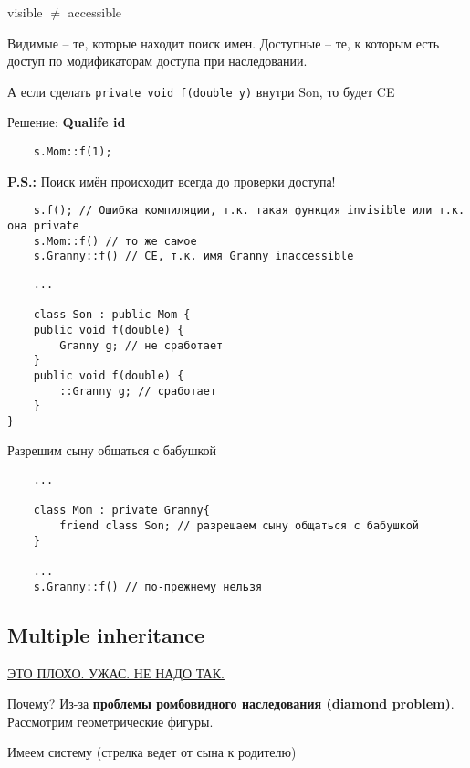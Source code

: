 \documentclass[12pt]{article}
\newcommand{\ps}{\textbf{P.S.: }}
\begin{document}
\begin{center}
visible $\not=$ accessible
\end{center}

Видимые -- те, которые находит поиск имен. 
Доступные -- те, к которым есть доступ по модификаторам доступа при наследовании. 

А если сделать \texttt{private void f(double y)} внутри Son, то будет CE

Решение: \textbf{Qualife id}

\begin{lstlisting}
	s.Mom::f(1);
\end{lstlisting}

\ps Поиск имён происходит всегда до проверки доступа!

\begin{lstlisting}
	s.f(); // Ошибка компиляции, т.к. такая функция invisible или т.к. она private
	s.Mom::f() // то же самое
	s.Granny::f() // CE, т.к. имя Granny inaccessible
\end{lstlisting}

\begin{lstlisting}
	...
	
	class Son : public Mom {
	public void f(double) {
		Granny g; // не сработает
	}
	public void f(double) {
		::Granny g; // сработает
	} 
}
\end{lstlisting}

Разрешим сыну общаться с бабушкой 

\begin{lstlisting}
	...

	class Mom : private Granny{
		friend class Son; // разрешаем сыну общаться с бабушкой
	}
	
	...
	s.Granny::f() // по-прежнему нельзя
\end{lstlisting}
 

\subsection{Multiple inheritance}

\begin{center}
	\underline{ЭТО ПЛОХО. УЖАС. НЕ НАДО ТАК.}
\end{center} 

Почему? Из-за \textbf{проблемы ромбовидного наследования (diamond problem)}. Рассмотрим геометрические фигуры. 

Имеем систему (стрелка ведет от сына к родителю)
\end{document}
